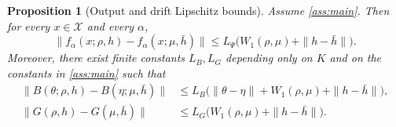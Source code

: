 \documentclass[11pt]{article}
\newtheorem{proposition}[theorem]{Proposition}
\theoremstyle{definition}
\newcommand{\W}{W_1}
\begin{document}
\begin{proposition}[Output and drift Lipschitz bounds]
\label{prop:lipschitz}
Assume \cref{ass:main}. Then for every $x\in\mathcal X$ and every $\alpha$,
\begin{equation}
  \|f_\alpha(x;\rho,h)-f_\alpha(x;\mu,\bar h)\|
  \le
  L_\Psi\bigl(\W(\rho,\mu)+\|h-\bar h\|\bigr).
  \label{eq:out-lip}
\end{equation}
Moreover, there exist finite constants $L_B,L_G$ depending only on $K$ and on
the constants in \cref{ass:main} such that
\begin{align}
  \|B(\theta;\rho,h)-B(\eta;\mu,\bar h)\|
  &\le
  L_B\bigl(
    \|\theta-\eta\|+\W(\rho,\mu)+\|h-\bar h\|
  \bigr),
  \label{eq:B-lip}\\
  \|G(\rho,h)-G(\mu,\bar h)\|
  &\le
  L_G\bigl(\W(\rho,\mu)+\|h-\bar h\|\bigr).
  \label{eq:G-lip}
\end{align}
\end{proposition}
\end{document}
